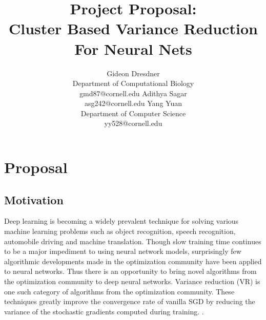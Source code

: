 \documentclass{article} %
\title{Project Proposal: \\Cluster Based Variance Reduction For Neural Nets}
\author{
Gideon Dresdner\\
Department of Computational Biology\\
gmd87@cornell.edu
\And
Adithya Sagar\\
asg242@cornell.edu
\And
Yang Yuan  \\
Department of Computer Science\\
yy528@cornell.edu
}
\begin{document}
\maketitle


\section{Proposal}
\subsection{Motivation}
Deep learning is becoming a widely prevalent technique for solving various machine learning problems such as object recognition, speech recognition, automobile driving and machine translation. 
Though slow training time continues to be a major impediment to using neural network models,
surprisingly few algorithmic developments made in the optimization community have been applied to neural networks. Thus there is an opportunity to bring novel algorithms from the optimization community to deep neural networks.
Variance reduction (VR) is one such category of algorithms from the optimization community.
These techniques greatly improve the convergence rate of vanilla SGD by reducing the variance of the stochastic gradients computed during training. \cite{JohnsonZhang2013-SVRG,Shalev-Shwartz2013-SDCA,Schmidt2013-SAG,Shalev-ShwartzZhang2014-ProxSDCA,XiaoZhang2014-ProximalSVRG,Defazio2014-Finito,Defazio2014-SAGA,Mairal2015-MISO,UniVR, exploitingstructure}.
\end{document}
